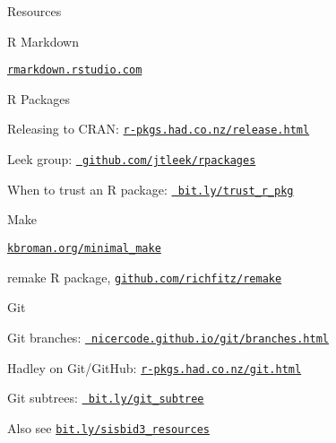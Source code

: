 \documentclass[12pt,t]{beamer}
\begin{document}
\begin{frame}[c]{Resources}

  \bi
\item R Markdown
  \bi
    \item \href{https://rmarkdown.rstudio.com}{\tt rmarkdown.rstudio.com}
  \ei
\item R Packages
  \bi
    \item Releasing to CRAN:
      \href{http://r-pkgs.had.co.nz/release.html}{\tt \footnotesize r-pkgs.had.co.nz/release.html}
    \item Leek group: \href{https://github.com/jtleek/rpackages}{\tt
      \footnotesize github.com/jtleek/rpackages}
    \item When to trust an R package:
      \href{https://simplystatistics.org/2015/11/06/how-i-decide-when-to-trust-an-r-package/}{\tt
        \footnotesize bit.ly/trust\_r\_pkg}
  \ei
\item Make
  \bi
    \item \href{http://kbroman.org/minimal_make}{\tt kbroman.org/minimal\_make}
    \item remake R package,
      \href{https://github.com/richfitz/remake}{\tt github.com/richfitz/remake}
  \ei
\item Git
  \bi
    \item Git branches:
      \href{https://nicercode.github.io/git/branches.html}{\tt
        \footnotesize nicercode.github.io/git/branches.html}
    \item Hadley on Git/GitHub:
      \href{http://r-pkgs.had.co.nz/git.html}{\tt \footnotesize r-pkgs.had.co.nz/git.html}
    \item Git subtrees:
      \href{https://developer.atlassian.com/blog/2015/05/the-power-of-git-subtree/}{\tt
        \footnotesize bit.ly/git\_subtree}
  \ei
  \item Also see \href{https://bit.ly/sisbid3_resources}{\tt bit.ly/sisbid3\_resources}
  \ei



\end{frame}
\end{document}
